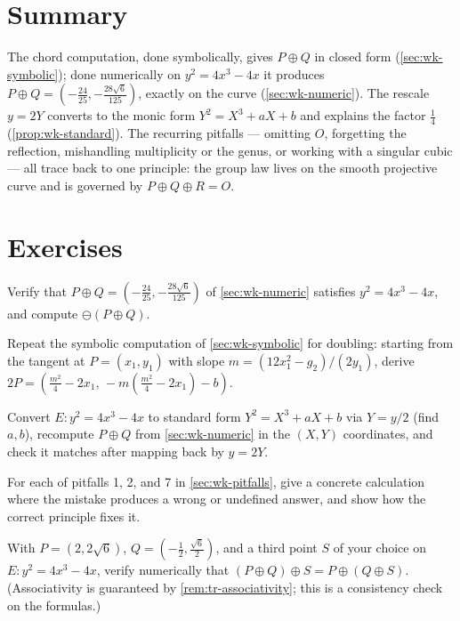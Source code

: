 \section{Summary}
\label{sec:wk-summary}

The chord computation, done symbolically, gives \(P \oplus Q\) in closed form
(\cref{sec:wk-symbolic}); done numerically on \(y^2 = 4x^3 - 4x\) it produces
\(P \oplus Q = (-\tfrac{24}{25}, -\tfrac{28\sqrt6}{125})\), exactly on the curve
(\cref{sec:wk-numeric}). The rescale \(y = 2Y\) converts to the monic form
\(Y^2 = X^3 + aX + b\) and explains the factor \(\tfrac14\)
(\cref{prop:wk-standard}). The recurring pitfalls --- omitting \(O\), forgetting
the reflection, mishandling multiplicity or the genus, or working with a singular
cubic --- all trace back to one principle: the group law lives on the smooth
projective curve and is governed by \(P \oplus Q \oplus R = O\).

\section*{Exercises}

\begin{exercise}
\label{ex:wk-numeric-check}
Verify that \(P \oplus Q = (-\tfrac{24}{25}, -\tfrac{28\sqrt6}{125})\) of
\cref{sec:wk-numeric} satisfies \(y^2 = 4x^3 - 4x\), and compute
\(\ominus(P \oplus Q)\).
\end{exercise}

\begin{exercise}
\label{ex:wk-doubling-symbolic}
Repeat the symbolic computation of \cref{sec:wk-symbolic} for doubling: starting
from the tangent at \(P = (x_1, y_1)\) with slope \(m = (12x_1^2 - g_2)/(2y_1)\),
derive \(2P = (\tfrac{m^2}{4} - 2x_1,\, -m(\tfrac{m^2}{4} - 2x_1) - b)\).
\end{exercise}

\begin{exercise}
\label{ex:wk-standard-recompute}
Convert \(E : y^2 = 4x^3 - 4x\) to standard form \(Y^2 = X^3 + aX + b\) via
\(Y = y/2\) (find \(a, b\)), recompute \(P \oplus Q\) from \cref{sec:wk-numeric} in
the \((X,Y)\) coordinates, and check it matches after mapping back by \(y = 2Y\).
\end{exercise}

\begin{exercise}
\label{ex:wk-pitfall-instances}
For each of pitfalls 1, 2, and 7 in \cref{sec:wk-pitfalls}, give a concrete
calculation where the mistake produces a wrong or undefined answer, and show how
the correct principle fixes it.
\end{exercise}

\begin{exercise}
\label{ex:wk-associativity-numeric}
With \(P = (2, 2\sqrt6)\), \(Q = (-\tfrac12, \tfrac{\sqrt6}{2})\), and a third
point \(S\) of your choice on \(E : y^2 = 4x^3 - 4x\), verify numerically that
\((P \oplus Q) \oplus S = P \oplus (Q \oplus S)\). (Associativity is guaranteed by
\cref{rem:tr-associativity}; this is a consistency check on the formulas.)
\end{exercise}
